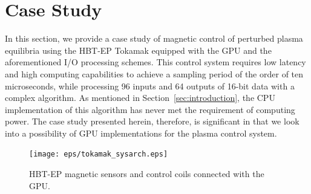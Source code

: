 \section{Case Study}
\label{sec:case_study}

In this section, we provide a case study of magnetic control of
perturbed plasma equilibria using the HBT-EP Tokamak equipped with
the GPU and the aforementioned I/O processing schemes.
This control system requires low latency and high computing capabilities
to achieve a sampling period of the order of ten microseconds, while
processing 96 inputs and 64 outputs of 16-bit data with a complex
algorithm.
As mentioned in Section~\ref{sec:introduction}, the CPU implementation
of this algorithm has never met the requirement of computing power.
The case study presented herein, therefore, is significant in that we look
into a possibility of GPU implementations for the plasma control system.

\begin{figure}[t]
 \centering
 \texttt{[image: eps/tokamak\_sysarch.eps]}
 \caption{HBT-EP magnetic sensors and control coils connected with the
 GPU.}
 \label{fig:tokamak_sysarch}
\end{figure}

